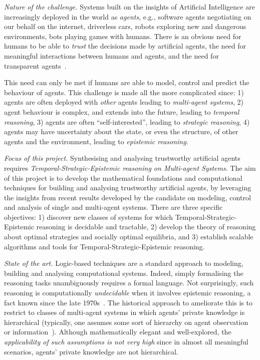 \documentclass[a4paper,12pt]{scrartcl}
\def\TSE{Temporal-Strategic-Epistemic\xspace}
\begin{document}
\emph{Nature of the challenge.} Systems built on the insights of Artificial Intelligence are increasingly deployed in the world as \emph{agents}, 
e.g., software agents negotiating on our behalf on the internet, driverless cars,  
robots exploring new and dangerous environments, bots playing games with humans. There is an obvious need for humans to 
be able to \emph{trust} the decisions made by artificial agents, 
the need for {meaningful interactions} between humans and agents, and the need for {transparent} agents~\cite{ACMStatement07}. 
	
{This need can only be met if humans are able to model, control and predict the {behaviour} of agents.} This challenge is made 
all the more complicated since: 1) agents are often deployed with \emph{other} agents leading to \emph{multi-agent systems}, 2) agent behaviour is complex, and extends into the future, leading to \emph{temporal reasoning}, 3)  agents are often ``self-interested'', leading to \emph{strategic reasoning}, 4)
agents may have uncertainty about the state, or even the structure, of other agents and the environment, leading to \emph{epistemic reasoning}.

\emph{Focus of this project.} Synthesising and analysing trustworthy artificial agents requires \emph{\TSE reasoning on Multi-agent Systems}.
{The aim of this project is to develop the mathematical foundations and computational techniques for building and analysing 
trustworthy artificial agents, by leveraging the insights from recent results developed by the candidate on modeling, control and analysis of single and multi-agent systems.} 
There are three specific objectives: 1) discover new classes of systems for which \TSE reasoning is decidable and tractable, 
2) develop the theory of reasoning about optimal strategies and socially optimal equilibria, and 3) establish scalable algorithms and tools for \TSE reasoning. 


\emph{State of the art.} Logic-based techniques are a standard approach to modeling, building and analysing computational systems. Indeed, simply {formalising} the reasoning tasks 
unambiguously requires a formal language. Not surprisingly, such reasoning is computationally \emph{undecidable} when it involves epistemic reasoning, a fact known since the late 1970s~\cite{DBLP:conf/focs/PetersonR79}. The historical approach to ameliorate this 
is to restrict to classes of multi-agent systems in which agents' private knowledge is hierarchical (typically, one assumes some sort of hierarchy on agent observation or information~\cite{DBLP:conf/focs/PetersonR79,DBLP:conf/focs/PnueliR90,DBLP:conf/lics/KupfermanV01, DBLP:conf/atva/BerwangerMB15,BMMRV17}). 
Although {mathematically elegant} and well-explored, the \emph{applicability of such assumptions is not very high} since in almost all meaningful scenarios, agents' private knowledge are not hierarchical.
\end{document}
